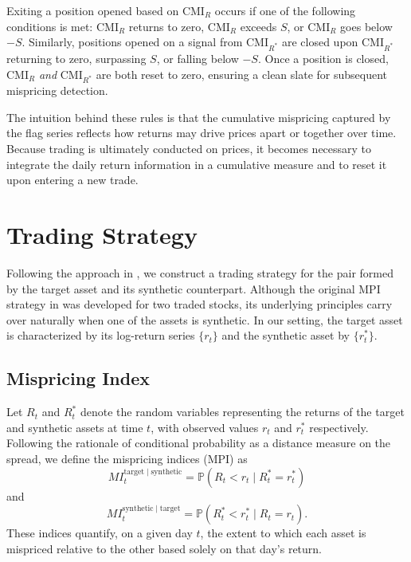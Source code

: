 Exiting a position opened based on $\text{CMI}_R$ occurs if one of the following conditions is met: $\text{CMI}_R$ returns to zero, $\text{CMI}_R$ exceeds $S$, or $\text{CMI}_R$ goes below $-S$. Similarly, positions opened on a signal from $\text{CMI}_{R^*}$ are closed upon $\text{CMI}_{R^*}$ returning to zero, surpassing $S$, or falling below $-S$. Once a position is closed, $\text{CMI}_R$ \emph{and} $\text{CMI}_{R^*}$ are both reset to zero, ensuring a clean slate for subsequent mispricing detection.

The intuition behind these rules is that the cumulative mispricing captured by the flag series reflects how returns may drive prices apart or together over time. Because trading is ultimately conducted on prices, it becomes necessary to integrate the daily return information in a cumulative measure and to reset it upon entering a new trade.




\section{Trading Strategy}
Following the approach in \cite{XieEtAl2016}, we construct a trading strategy for the pair formed by the target asset and its synthetic counterpart. Although the original MPI strategy in \cite{XieEtAl2016} was developed for two traded stocks, its underlying principles carry over naturally when one of the assets is synthetic. In our setting, the target asset is characterized by its log-return series $\{r_t\}$ and the synthetic asset by $\{r_t^*\}$.

\subsection{Mispricing Index}
Let $R_t$ and $R_t^*$ denote the random variables representing the returns of the target and synthetic assets at time $t$, with observed values $r_t$ and $r_t^*$ respectively. Following the rationale of conditional probability as a distance measure on the spread, we define the mispricing indices (MPI) as
$$
MI_t^{\mathrm{target}\mid\mathrm{synthetic}} = \mathbb{P}(R_t < r_t \mid R_t^* = r_t^*)
$$
and
$$
MI_t^{\mathrm{synthetic}\mid\mathrm{target}} = \mathbb{P}(R_t^* < r_t^* \mid R_t = r_t).
$$
These indices quantify, on a given day $t$, the extent to which each asset is mispriced relative to the other based solely on that day's return.

